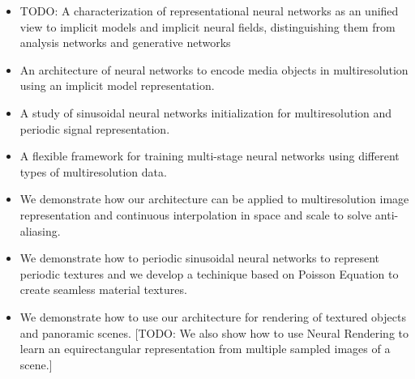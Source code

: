 \begin{itemize}
    \item TODO: A characterization of representational neural networks as an unified view to implicit models and implicit neural fields, distinguishing them from analysis networks and generative networks
    \item An architecture of neural networks to encode media objects in multiresolution using an implicit model representation.
    \item A study of sinusoidal neural networks initialization for multiresolution and periodic signal representation.
    \item A flexible framework for training multi-stage neural networks using different types of multiresolution data.
    \item We demonstrate how our architecture can be applied to multiresolution image representation and continuous interpolation in space and scale to solve anti-aliasing.
    \item We demonstrate how to periodic sinusoidal neural networks to represent periodic textures and we develop a techinique based on Poisson Equation to create seamless material textures.
    \item We demonstrate how to use our architecture for rendering of textured objects and panoramic scenes. [TODO: We also show how to use Neural Rendering to learn an equirectangular representation from multiple sampled images of a scene.]
\end{itemize}





